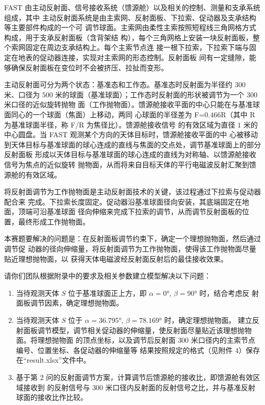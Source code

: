 \documentclass[withoutpreface,bwprint]{cumcmthesis} %
\begin{document}
FAST 由主动反射面、信号接收系统（馈源舱）以及相关的控制、测量和支承系统组成，其中
主动反射面系统是由主索网、反射面板、下拉索、促动器及支承结构等主要部件构成的一个可
调节球面。主索网由柔性主索按照短程线三角网格方式构成，用于支承反射面板（含背架结
构），每个三角网格上安装一块反射面板，整个索网固定在周边支承结构上。每个主索节点连
接一根下拉索，下拉索下端与固定在地表的促动器连接，实现对主索网的形态控制。反射面板
间有一定缝隙，能够确保反射面板在变位时不会被挤压、拉扯而变形。

主动反射面可分为两个状态：基准态和工作态。基准态时反射面为半径约 $300$ 米、口径为
$500$ 米的球面（基准球面）；工作态时反射面的形状被调节为一个 $300$ 米口径的近似旋转抛物
面（工作抛物面）。馈源舱接收平面的中心只能在与基准球面同心的一个球面（焦面）上移动，两同
心球面的半径差为 F=$0.466$R（其中 R 为基准球面半径，称 F/R 为焦径比）。馈源舱接收信号
的有效区域为直径 $1$ 米的中心圆盘。当 FAST 观测某个方向的天体目标时，馈源舱接收平面的中
心被移动到天体目标与基准球面的球心连成的直线与焦面的交点处，调节基准球面上的部分反射面板
形成以天体目标与基准球面的球心连成的直线为对称轴、以馈源舱接收信号为焦点的近似旋转
抛物面，从而将来自目标天体的平行电磁波反射汇聚到馈源舱的有效区域。

将反射面调节为工作抛物面是主动反射面技术的关键，该过程通过下拉索与促动器配合来
完成。下拉索长度固定。促动器沿基准球面径向安装，其底端固定在地面，顶端可沿基准球面
径向伸缩来完成下拉索的调节，从而调节反射面板的位置，最终形成工作抛物面。

本赛题要解决的问题是：在反射面板调节约束下，确定一个理想抛物面，然后通过调节促
动器的径向伸缩量，将反射面调节为工作抛物面，使得该工作抛物面尽量贴近理想抛物面，以
获得天体电磁波经反射面反射后的最佳接收效果。

请你们团队根据附录中的要求及相关参数建立模型解决以下问题：
\begin{enumerate}
    \item 当待观测天体 $𝑆$ 位于基准球面正上方，即 $\alpha = 0°$, $\beta = 90°$ 时，结合考虑反
          射面板调节因素，确定理想抛物面。
    \item 当待观测天体 $𝑆$ 位于 $\alpha = 36.795°$, $\beta = 78.169°$ 时，确定理想抛物面。
          建立反射面板调节模型，调节相关促动器的伸缩量，使反射面尽量贴近该理想抛物面。将理想抛物面
          的顶点坐标，以及调节后反射面 $300$ 米口径内的主索节点编号、位置坐标、各促动器的伸缩量等
          结果按照规定的格式（见附件 $4$）保存在“result.xlsx”文件中。
    \item 基于第 $2$ 问的反射面调节方案，计算调节后馈源舱的接收比，即馈源舱有效区域接收到
          的反射信号与 $300$ 米口径内反射面的反射信号之比，并与基准反射球面的接收比作比较。
\end{enumerate}
\end{document}
